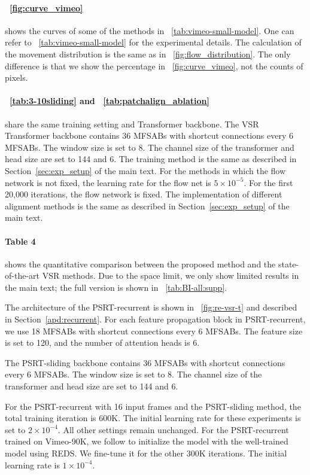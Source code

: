 \documentclass{article}
\begin{document}
\vspace{-3mm}
\paragraph{\figurename~\ref{fig:curve_vimeo}}
shows the curves of some of the methods in \tablename~\ref{tab:vimeo-small-model}.
One can refer to \tablename~\ref{tab:vimeo-small-model} for the experimental details.
The calculation of the movement distribution is the same as in \figurename~\ref{fig:flow_distribution}.
The only difference is that we show the percentage in \figurename~\ref{fig:curve_vimeo}, not the counts of pixels.

\vspace{-3mm}
\paragraph{\tablename~\ref{tab:3-10sliding} and \tablename~\ref{tab:patchalign_ablation}}
share the same training setting and Transformer backbone.
The VSR Transformer backbone contains 36 MFSABs with shortcut connections every 6 MFSABs.
The window size is set to 8.
The channel size of the transformer and head size are set to 144 and 6.
The training method is the same as described in Section~\ref{sec:exp_setup} of the main text.
For the methods in which the flow network is not fixed, the learning rate for the flow net is $5\times10^{-5}$.
For the first 20,000 iterations, the flow network is fixed.
The implementation of different alignment methods is the same as described in Section~\ref{sec:exp_setup} of the main text.

\vspace{-3mm}
\paragraph{Table 4}
shows the quantitative comparison between the proposed method and the state-of-the-art VSR methods.
Due to the space limit, we only show limited results in the main text; the full version is shown in \tablename~\ref{tab:BI-all:supp}.


The architecture of the PSRT-recurrent is shown in \figurename~\ref{fig:re-vsr-t} and described in Section~\ref{apd:recurrent}.
For each feature propagation block in PSRT-recurrent, we use 18 MFSABs with shortcut connections every 6 MFSABs.
The feature size is set to 120, and the number of attention heads is 6.


The PSRT-sliding backbone contains 36 MFSABs with shortcut connections every 6 MFSABs.
The window size is set to 8.
The channel size of the transformer and head size are set to 144 and 6.


For the PSRT-recurrent with 16 input frames and the PSRT-sliding method, the total training iteration is 600K.
The initial learning rate for these experiments is set to $2\times10^{-4}$.
All other settings remain unchanged.
For the PSRT-recurrent trained on Vimeo-90K, we follow \cite{chan2021basicvsr++} to initialize the model with the well-trained model using REDS.
We fine-tune it for the other 300K iterations.
The initial learning rate is $1\times10^{-4}$.
\end{document}
